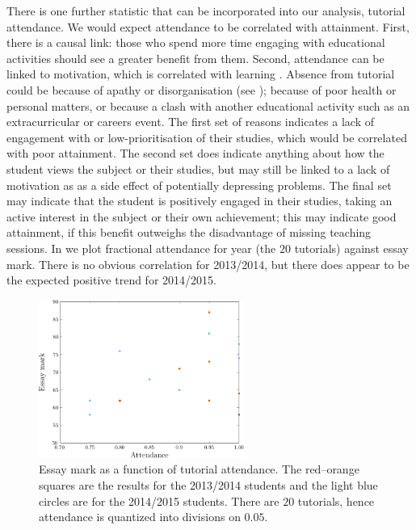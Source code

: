 There is one further statistic that can be incorporated into our analysis, tutorial attendance. We would expect attendance to be correlated with attainment. First, there is a causal link: those who spend more time engaging with educational activities should see a greater benefit from them. Second, attendance can be linked to motivation, which is correlated with learning \citep[e.g.,][chapter 4]{Ramsden1992}. Absence from tutorial could be because of apathy or disorganisation (see ); because of poor health or personal matters, or because a clash with another educational activity such as an extracurricular or careers event. The first set of reasons indicates a lack of engagement with or low-prioritisation of their studies, which would be correlated with poor attainment. The second set does indicate anything about how the student views the subject or their studies, but may still be linked to a lack of motivation as as a side effect of potentially depressing problems. The final set may indicate that the student is positively engaged in their studies, taking an active interest in the subject or their own achievement; this may indicate good attainment, if this benefit outweighs the disadvantage of missing teaching sessions. In  we plot fractional attendance for year (the $20$ tutorials) against essay mark. There is no obvious correlation for 2013/2014, but there does appear to be the expected positive trend for 2014/2015.
\begin{figure}
  \centering
   \includegraphics[width=0.6\textwidth]{./figs/Fig_attend}
\caption{Essay mark as a function of tutorial attendance. The red--orange squares are the results for the 2013/2014 students and the light blue circles are for the 2014/2015 students. There are $20$ tutorials, hence attendance is quantized into divisions on $0.05$.}
  \label{fig:attend}
\end{figure}

